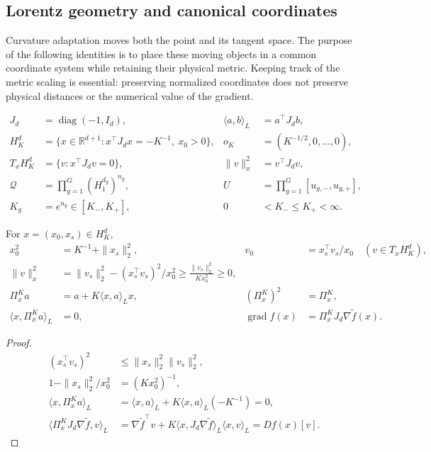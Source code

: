 \subsection{Lorentz geometry and canonical coordinates}
\label{app:rigid-geometry}
Curvature adaptation moves both the point and its tangent space. The purpose of the following identities is to place these moving objects in a common coordinate system while retaining their physical metric. Keeping track of the metric scaling is essential: preserving normalized coordinates does not preserve physical distances or the numerical value of the gradient.
\begin{definition}
\begin{align}
 J_d&=\operatorname{diag}(-1,I_d),&
 \langle a,b\rangle_L&=a^\top J_db,\\
 H_K^d&=\{x\in\mathbb R^{d+1}:x^\top J_dx=-K^{-1},\ x_0>0\},&
 o_K&=(K^{-1/2},0,\ldots,0),\\
 T_xH_K^d&=\{v:x^\top J_dv=0\},&
 \|v\|_x^2&=v^\top J_dv,\\
 \mathcal Q&=\prod_{g=1}^G(H_1^{d_g})^{n_g},&
 U&=\prod_{g=1}^G[u_{g,-},u_{g,+}],\\
 K_g&=e^{u_g}\in[K_-,K_+],&0&<K_-\le K_+<\infty.
\end{align}
\end{definition}

\begin{lemma}
For $x=(x_0,x_s)\in H_K^d$,
\begin{align}
 x_0^2&=K^{-1}+\|x_s\|_2^2,&
 v_0&=x_s^\top v_s/x_0\quad(v\in T_xH_K^d),\\
 \|v\|_x^2
 &=\|v_s\|_2^2-(x_s^\top v_s)^2/x_0^2
 \ge\frac{\|v_s\|_2^2}{Kx_0^2}\ge0,\\
 \Pi_x^K a&=a+K\langle x,a\rangle_Lx,&
 (\Pi_x^K)^2&=\Pi_x^K,\\
 \langle x,\Pi_x^Ka\rangle_L&=0,&
 \operatorname{grad}f(x)&=\Pi_x^KJ_d\nabla\widetilde f(x).
\end{align}
\end{lemma}
\begin{proof}
\begin{align}
 (x_s^\top v_s)^2
 &\le\|x_s\|_2^2\|v_s\|_2^2,\\
 1-\|x_s\|_2^2/x_0^2&=(Kx_0^2)^{-1},\\
 \langle x,\Pi_x^Ka\rangle_L
 &=\langle x,a\rangle_L+K\langle x,a\rangle_L(-K^{-1})=0,\\
 \langle\Pi_x^KJ_d\nabla\widetilde f,v\rangle_L
 &=\nabla\widetilde f^\top v
   +K\langle x,J_d\nabla\widetilde f\rangle_L\langle x,v\rangle_L
 =Df(x)[v].
\end{align}
\end{proof}

